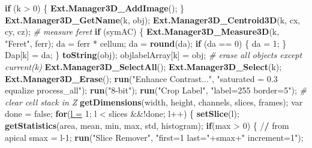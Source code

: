 \documentclass[11pt,singlespacinge,twoside]{reedthesis} %
\newenvironment{Shaded}{}{}
\newcommand{\CommentTok}[1]{\textit{#1}}
\newcommand{\ControlFlowTok}[1]{\textbf{#1}}
\newcommand{\DataTypeTok}[1]{\underline{#1}}
\newcommand{\DecValTok}[1]{#1}
\newcommand{\ErrorTok}[1]{\textbf{#1}}
\newcommand{\KeywordTok}[1]{\textbf{#1}}
\newcommand{\NormalTok}[1]{#1}
\newcommand{\OperatorTok}[1]{#1}
\newcommand{\StringTok}[1]{#1}
\theoremstyle{definition}
\theoremstyle{definition}
\theoremstyle{definition}
\theoremstyle{remark}
\begin{document}
\begin{Shaded}
\begin{Highlighting}[numbers=left,,]
            \ControlFlowTok{if}\NormalTok{ (k }\OperatorTok{>}\StringTok{ }\DecValTok{0}\NormalTok{) \{}
              \KeywordTok{Ext.Manager3D_AddImage}\NormalTok{();}
\NormalTok{            \}}
        \KeywordTok{Ext.Manager3D_GetName}\NormalTok{(k, obj);}
        \KeywordTok{Ext.Manager3D_Centroid3D}\NormalTok{(k, cx, cy, cz);}
    \CommentTok{# measure feret}
        \ControlFlowTok{if}\NormalTok{ (symAC) \{}
          \KeywordTok{Ext.Manager3D_Measure3D}\NormalTok{(k, }\StringTok{"Feret"}\NormalTok{, ferr); }
\NormalTok{            da =}\StringTok{ }\NormalTok{ferr }\OperatorTok{*}\StringTok{ }\NormalTok{cellum;}
\NormalTok{            da =}\StringTok{ }\KeywordTok{round}\NormalTok{(da);}
          \ControlFlowTok{if}\NormalTok{ (da }\OperatorTok{==}\StringTok{ }\DecValTok{0}\NormalTok{) \{}
\NormalTok{              da =}\StringTok{ }\DecValTok{1}\NormalTok{;}
\NormalTok{          \}}
\NormalTok{        Dap[k] =}\StringTok{ }\NormalTok{da;}
\NormalTok{        \}}
        \KeywordTok{toString}\NormalTok{(obj);}
\NormalTok{        objlabelArray[k] =}\StringTok{ }\NormalTok{obj;}
    \CommentTok{# erase all objects except current(k)}
        \KeywordTok{Ext.Manager3D_SelectAll}\NormalTok{();}
        \KeywordTok{Ext.Manager3D_Select}\NormalTok{(k);}
        \KeywordTok{Ext.Manager3D_Erase}\NormalTok{();}
        \KeywordTok{run}\NormalTok{(}\StringTok{"Enhance Contrast..."}\NormalTok{, }\StringTok{"saturated = 0.3 equalize process_all"}\NormalTok{);}
        \KeywordTok{run}\NormalTok{(}\StringTok{"8-bit"}\NormalTok{);}
        \KeywordTok{run}\NormalTok{(}\StringTok{"Crop Label"}\NormalTok{, }\StringTok{"label=255 border=5"}\NormalTok{);}
    \CommentTok{# clear cell stack in Z}
        \KeywordTok{getDimensions}\NormalTok{(width, height, channels, slices, frames);}
\NormalTok{        var done =}\StringTok{ }\NormalTok{false; }
        \ControlFlowTok{for}\NormalTok{(}\DataTypeTok{l =} \DecValTok{1}\NormalTok{; l }\OperatorTok{<}\StringTok{ }\NormalTok{slices }\OperatorTok{&&!}\NormalTok{done; l}\OperatorTok{++}\NormalTok{) \{}
          \KeywordTok{setSlice}\NormalTok{(l);}
            \KeywordTok{getStatistics}\NormalTok{(area, mean, min, max, std, histogram);}
            \ControlFlowTok{if}\NormalTok{(max }\OperatorTok{>}\StringTok{ }\DecValTok{0}\NormalTok{) \{ }\OperatorTok{/}\ErrorTok{/}\StringTok{ }\NormalTok{from apical}
\NormalTok{            smax =}\StringTok{ }\NormalTok{l}\DecValTok{-1}\NormalTok{;}
            \KeywordTok{run}\NormalTok{(}\StringTok{"Slice Remover"}\NormalTok{, }\StringTok{"first=1 last="}\OperatorTok{+}\NormalTok{smax}\OperatorTok{+}\StringTok{" increment=1"}\NormalTok{);}

\end{Highlighting}
\end{Shaded}
\end{document}
